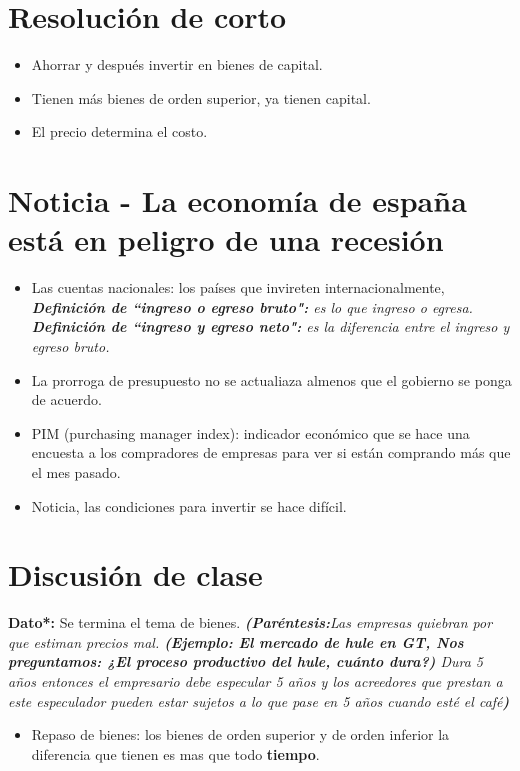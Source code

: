 \section{Resolución de corto}
\begin{itemize}
    \item Ahorrar y después invertir en bienes de capital.
    \item Tienen más bienes de orden superior, ya tienen capital.
    \item El precio determina el costo.
\end{itemize}

\section{Noticia - La economía de españa está en peligro de una recesión}
\begin{itemize}
    \item Las cuentas nacionales: los países que invireten internacionalmente, \emph{\textbf{Definición de ``ingreso o egreso bruto":} es lo que ingreso o egresa.} \emph{\textbf{Definición de ``ingreso y egreso neto":} es la diferencia entre el ingreso y egreso bruto.}
    \item La prorroga de presupuesto no se actualiaza almenos que el gobierno se ponga de acuerdo. 
    \item PIM (purchasing manager index): indicador económico que se hace una encuesta a los compradores de empresas para ver si están comprando más que el mes pasado.
    \item Noticia, las condiciones para invertir se hace difícil.
\end{itemize}



\section{Discusión de clase}
\textbf{Dato*:} Se termina el tema de bienes.
\emph{\textbf{(Paréntesis:}Las empresas quiebran por que estiman precios mal. \textbf{\emph{(Ejemplo: El mercado de hule en GT, \textbf{Nos preguntamos:} ¿El proceso productivo del hule, cuánto dura?)}} Dura 5 años entonces el empresario debe especular 5 años y los acreedores que prestan a este especulador pueden estar sujetos a lo que pase en 5 años cuando esté el café\textbf{)}}

\begin{itemize}
    \item Repaso de bienes: los bienes de orden superior y de orden inferior la diferencia que tienen es mas que todo \textbf{tiempo}.
\end{itemize}

